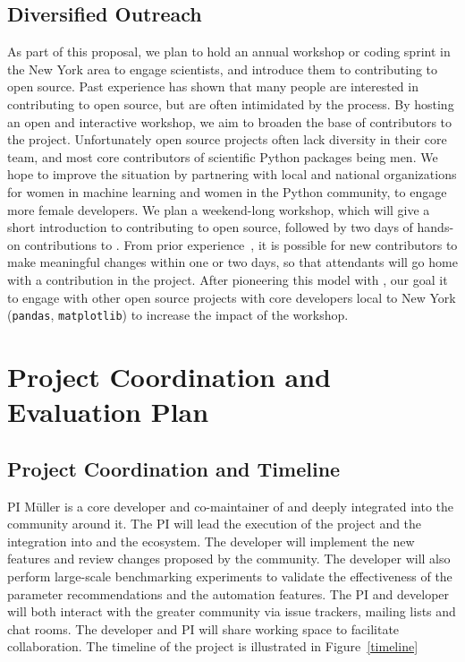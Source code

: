 \subsection{Diversified Outreach}
As part of this proposal, we plan to hold an annual workshop or coding sprint
in the New York area to engage scientists, and introduce them to contributing
to open source. Past experience has shown that many people are interested
in contributing to open source, but are often intimidated by the process.
By hosting an open and interactive workshop, we aim to broaden the base
of contributors to the \sklearn{} project.
Unfortunately open source projects often lack diversity in their core team,
and most core contributors of scientific Python packages being men.
We hope to improve the situation by partnering with local and national
organizations for women in machine learning and women in the Python community,
to engage more female developers.
We plan a weekend-long workshop, which will give a short introduction to
contributing to open source, followed by two days of hands-on contributions to
\sklearn{}.
From prior experience~\textcite{meetupsprintSF}, it is possible for new
contributors to make meaningful changes within one or two days, so that
attendants will go home with a contribution in the project. After pioneering
this model with \sklearn{}, our goal it to engage with other open source
projects with core developers local to New York (\texttt{pandas},
\texttt{matplotlib}) to increase the impact of the workshop.

\section{Project Coordination and Evaluation Plan}
\subsection{Project Coordination and Timeline}
PI M\"uller is a core developer and co-maintainer of \sklearn{} and deeply integrated
into the community around it. The PI will lead the execution of the project and the integration
into \sklearn{} and the \sklearn{} ecosystem.
The developer will implement the new features and review changes proposed by
the \sklearn{} community. The developer will also perform large-scale
benchmarking experiments to validate the effectiveness of the parameter
recommendations and the automation features.  The PI and developer will both
interact with the greater community via issue trackers, mailing lists and
chat rooms. The developer and PI will share working space to facilitate
collaboration. The timeline of the project is illustrated in Figure~\ref{timeline}

